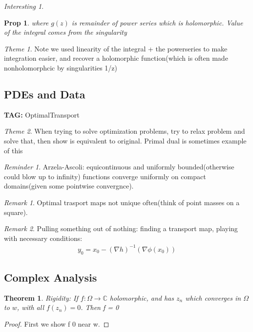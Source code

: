 \documentclass[11pt]{article}
\newcommand{\C}{\mathbb{C}}
\newtheorem{theorem}{Theorem}
\newtheorem{prop}{Prop}
\theoremstyle{remark}
\newtheorem{remark}{Remark}
\newtheorem{interest}{Interesting}
\newtheorem{theme}{Theme}
\newtheorem{reminder}{Reminder}
\begin{document}
\begin{interest}
\begin{prop}
	where $g(z)$ is remainder of power series which is holomorphic. Value of the integral comes from the singularity
\end{prop}
\begin{theme}
	Note we used linearity of the integral + the powerseries to make integration easier, and recover a holomorphic function(which is often made nonholomorphcic by singularities 1/z)
\end{theme}

\subsection{PDEs and Data}

\textbf{TAG:} OptimalTransport

\begin{theme}
	When trying to solve optimization problems, try to relax problem and solve that, then show is equivalent to original. Primal dual is sometimes example of this
\end{theme}

\begin{reminder}
	Arzela-Ascoli: equicontinuous and uniformly bounded(otherwise could blow up to infinity) functions converge uniformly on compact domains(given some pointwise convergnce). 
\end{reminder}

\begin{remark}
	Optimal trasport maps not unique often(think of point masses on a square).
\end{remark}

\begin{remark}
	Pulling something out of nothing: finding a transport map, playing with necessary conditions:
	\begin{align*}
		y_0 = x_0 - (\nabla h)^{-1}(\nabla \phi(x_0))
	\end{align*}
\end{remark}


\subsection{Complex Analysis}

\begin{theorem}
	\textit{Rigidity}: If $f : \Omega \to \C$ holomorphic, and has $z_n$ which converges in $\Omega$ to $w$, with all $f(z_n) = 0$. Then f = 0
\end{theorem}

\begin{proof}
	First we show f 0 near w. 


\end{proof}
\end{interest}
\end{document}
